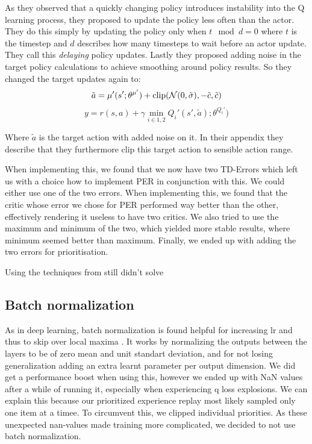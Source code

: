 \documentclass[hyperref,german,beleg]{cgvpub}
\begin{document}
As they observed that a quickly changing policy introduces instability into the Q learning process, they proposed to update the policy less often than the actor. They do this simply by updating the policy only when $t\mod d = 0$ where $t$ is the timestep and $d$ describes how many timesteps to wait before an actor update. They call this \textit{delaying} policy updates. Lastly they proposed adding noise in the target policy calculations to achieve smoothing around policy results. So they changed the target updates again to:
\begin{equation}
\tilde{a} = \mu'(s';\theta^{\mu'}) + \text{clip}(\mathcal{N}(0, \tilde{\sigma}), -\tilde{c}, \tilde{c})\\
\end{equation}
\begin{equation}
y = r(s, a) + \gamma \min_{i \in {1,2}} Q_i'(s', \tilde{a});\theta^{Q_i'})
\end{equation}

Where $\tilde{a}$ is the target action with added noise on it. In their appendix they describe that they furthermore clip this target action to sensible action range.

When implementing this, we found that we now have two \ac{TD-Error}s which left us with a choice how to implement \ac{PER} in conjunction with this. We could either use one of the two errors. When implementing this, we found that the critic whose error we chose for \ac{PER} performed way better than the other, effectively rendering it useless to have two critics. We also tried to use the maximum and minimum of the two, which yielded more stable results, where minimum seemed better than maximum. Finally, we ended up with adding the two errors for prioritisation.

Using the techniques from \cite{fujimotoAddressingFunctionApproximation2018} still didn't solve

\subsection{Batch normalization}
As in deep learning, batch normalization is found helpful for increasing lr and thus to skip over local maxima \cite{bjorckUnderstandingBatchNormalization}. It works by normalizing the outputs between the layers to be of zero mean and unit standart deviation, and for not losing generalization adding an extra learnt parameter per output dimension. We did get a performance boost when using this, however we ended up with NaN values after a while of running it, especially when experiencing q loss explosions. We can explain this because our prioritized experience replay most likely sampled only one item at a timee. To circumvent this, we clipped individual priorities. As these unexpected nan-values made training more complicated, we decided to not use batch normalization.
\end{document}

